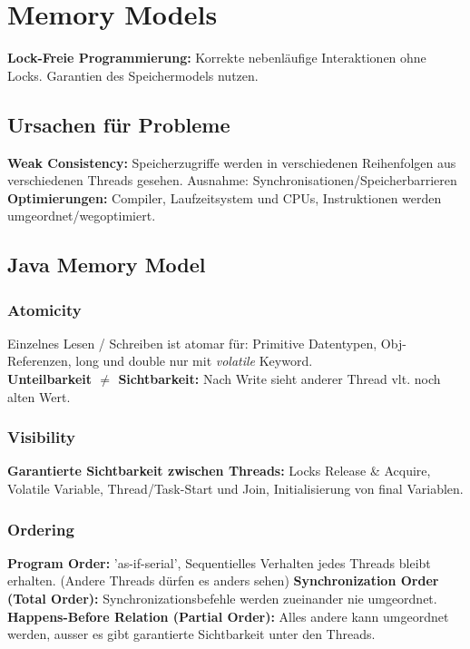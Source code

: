 \section{Memory Models}
\textbf{Lock-Freie Programmierung:} Korrekte nebenläufige Interaktionen ohne Locks.
Garantien des Speichermodels nutzen.
\subsection{Ursachen für Probleme}
\textbf{Weak Consistency:} Speicherzugriffe werden in verschiedenen Reihenfolgen aus verschiedenen Threads gesehen.
Ausnahme: Synchronisationen/Speicherbarrieren
\textbf{Optimierungen:} Compiler, Laufzeitsystem und CPUs, Instruktionen werden umgeordnet/wegoptimiert.

\subsection{Java Memory Model}
\subsubsection{Atomicity}
Einzelnes Lesen / Schreiben ist atomar für: Primitive Datentypen, Obj-Referenzen, long und double nur mit \textit{volatile} Keyword.\\ 
\textbf{Unteilbarkeit $\neq$ Sichtbarkeit:} Nach Write sieht anderer Thread vlt. noch alten Wert.

\subsubsection{Visibility}
\textbf{Garantierte Sichtbarkeit zwischen Threads:}
Locks Release \& Acquire, Volatile Variable, Thread/Task-Start und Join, Initialisierung von final Variablen.

\subsubsection{Ordering}
\textbf{Program Order:} 'as-if-serial', Sequentielles Verhalten jedes Threads bleibt erhalten. (Andere Threads dürfen es anders sehen)
\textbf{Synchronization Order (Total Order):} Synchronizationsbefehle werden zueinander nie umgeordnet.
\textbf{Happens-Before Relation (Partial Order):} Alles andere kann umgeordnet werden, ausser es gibt garantierte Sichtbarkeit unter den Threads.

